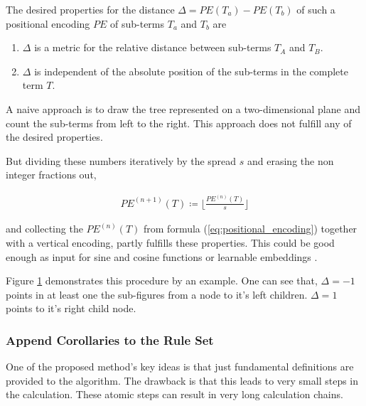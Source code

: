 \documentclass{scrartcl}
\theoremstyle{definition}
\begin{document}
The desired properties for the distance $\Delta= PE\left( T_a \right) - PE\left( T_b \right)$ of such a positional encoding $PE$ of sub-terms $T_a$ and $T_b$ are
\begin{enumerate}[label=(\roman*)]
	\item $\Delta$ is a metric for the relative distance between sub-terms $T_A$ and $T_B$.
	\item $\Delta$ is independent of the absolute position of the sub-terms in the complete term $T$.
\end{enumerate}

A naive approach is to draw the tree represented on a two-dimensional plane and count the sub-terms from left to the right.
This approach does not fulfill any of the desired properties.

But dividing these numbers iteratively by the spread $s$ and erasing the non integer fractions out,

\begin{align}
	PE^{(n+1)}\left( T \right) \coloneqq \lfloor \frac{PE^{(n)} \left( T \right)}{s} \rfloor
	\label{eq:positional_encoding}
\end{align}

and collecting the $PE^{(n)}\left( T \right)$ from formula (\ref{eq:positional_encoding}) together with a vertical encoding, partly fulfills these properties.
This could be good enough as input for sine and cosine functions or learnable embeddings \cite{gehring2017convolutional}.

\begin{figure}[!htbp]
	\centering
	
	\label{fig:positional_encoding}
\end{figure}

Figure \ref{fig:positional_encoding} demonstrates this procedure by an example.
One can see that, $\Delta=-1$ points in at least one the sub-figures from a node to it's left children. $\Delta=1$ points to it's right child node. 


\subsubsection{Append Corollaries to the Rule Set}

One of the proposed method's key ideas is that just fundamental definitions are provided to the algorithm.
The drawback is that this leads to very small steps in the calculation.
These atomic steps can result in very long calculation chains.%
\end{document}
